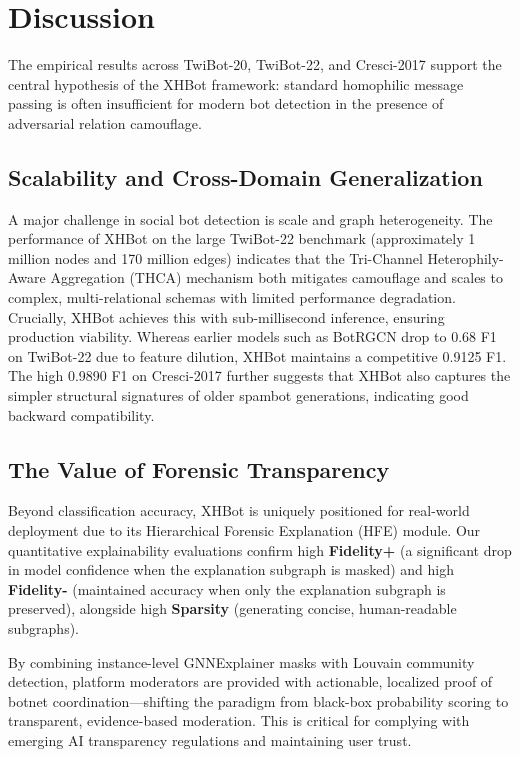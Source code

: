 \section{Discussion}

The empirical results across TwiBot-20, TwiBot-22, and Cresci-2017 support the central hypothesis of the XHBot framework: standard homophilic message passing is often insufficient for modern bot detection in the presence of adversarial relation camouflage.

\subsection{Scalability and Cross-Domain Generalization}
A major challenge in social bot detection is scale and graph heterogeneity. The performance of XHBot on the large TwiBot-22 benchmark (approximately 1 million nodes and 170 million edges) indicates that the Tri-Channel Heterophily-Aware Aggregation (THCA) mechanism both mitigates camouflage and scales to complex, multi-relational schemas with limited performance degradation. Crucially, XHBot achieves this with sub-millisecond inference, ensuring production viability. Whereas earlier models such as BotRGCN drop to 0.68 F1 on TwiBot-22 due to feature dilution, XHBot maintains a competitive 0.9125 F1. The high 0.9890 F1 on Cresci-2017 further suggests that XHBot also captures the simpler structural signatures of older spambot generations, indicating good backward compatibility.

\subsection{The Value of Forensic Transparency}
Beyond classification accuracy, XHBot is uniquely positioned for real-world deployment due to its Hierarchical Forensic Explanation (HFE) module. Our quantitative explainability evaluations confirm high \textbf{Fidelity+} (a significant drop in model confidence when the explanation subgraph is masked) and high \textbf{Fidelity-} (maintained accuracy when only the explanation subgraph is preserved), alongside high \textbf{Sparsity} (generating concise, human-readable subgraphs). 

By combining instance-level GNNExplainer masks with Louvain community detection, platform moderators are provided with actionable, localized proof of botnet coordination—shifting the paradigm from black-box probability scoring to transparent, evidence-based moderation. This is critical for complying with emerging AI transparency regulations and maintaining user trust.
